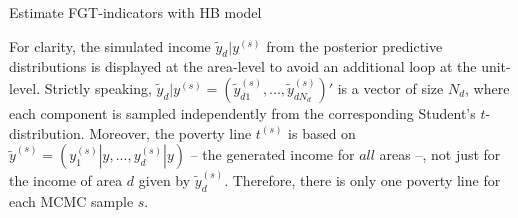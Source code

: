 \begin{algorithm}
    \caption{Estimate FGT-indicators with HB model}

\end{algorithm}

For clarity, the simulated income $\tilde y_d|y^{(s)}$ from the posterior predictive distributions is displayed at the area-level to avoid an additional loop at the unit-level.
Strictly speaking, $\tilde y_d|y^{(s)} = (\tilde y_{d1}^{(s)}, ..., \tilde y_{dN_d}^{(s)})'$ is a vector of size $N_d$, where each component is sampled independently from the corresponding Student's $t$-distribution.
Moreover, the poverty line $t^{(s)}$ is based on $\tilde y^{(s)} = (y^{(s)}_1|y, ..., y^{(s)}_d|y)$ – the generated income for $all$ areas –, not just for the income of area $d$ given by $\tilde y_d^{(s)}$. Therefore, there is only one poverty line for each MCMC sample $s$.

